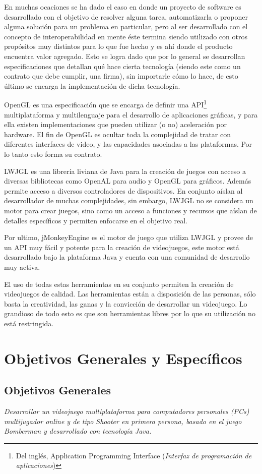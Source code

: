 \documentclass[a4paper,12pt,openany,oneside]{book}
\begin{document}
En muchas ocaciones se ha dado el caso en donde un proyecto de software es desarrollado con el objetivo de resolver alguna tarea, automatizarla o proponer alguna solución para un problema en particular, pero al ser desarrollado con el concepto de interoperabilidad en mente éste termina siendo utilizado con otros propósitos muy distintos para lo que fue hecho y es ahí donde el producto encuentra valor agregado. Esto se logra dado que por lo general se desarrollan especificaciones que detallan qué hace cierta tecnología (siendo este como un contrato que debe cumplir, una firma), sin importarle cómo lo hace, de esto último se encarga la implementación de dicha tecnología.

OpenGL es una especificación que se encarga de definir una API\footnote{Del inglés, Application Programming Interface (\textit{Interfaz de programación de aplicaciones})} multiplataforma y multilenguaje para el desarrollo de aplicaciones gráficas, y para ella existen implementaciones que pueden utilizar (o no) aceleración por hardware. El fin de OpenGL es ocultar toda la complejidad de tratar con diferentes interfaces de video, y las capacidades asociadas a las plataformas. Por lo tanto esto forma su contrato.

LWJGL es una librería liviana de Java para la creación de juegos con acceso a diversas bibliotecas como OpenAL para audio y OpenGL para gráficos. Además permite acceso a diversos controladores de dispositivos. En conjunto aíslan al desarrollador de muchas complejidades, sin embargo, LWJGL no se considera un motor para crear juegos, sino como un acceso a funciones y recursos que aíslan de detalles específicos y permiten enfocarse en el objetivo real.

Por ultimo, jMonkeyEngine es el motor de juego que utiliza LWJGL y provee de un API muy fácil y potente para la creación de videojuegos, este motor está desarrollado bajo la plataforma Java y cuenta con una comunidad de desarrollo muy activa.

El uso de todas estas herramientas en su conjunto permiten la creación de
videojuegos de calidad. Las herramientas están a disposición de las personas, sólo basta la creatividad, las ganas y la convicción de desarrollar un videojuego. Lo grandioso de todo esto es que son herramientas libres por lo que su utilización no está restringida.
\section{Objetivos Generales y Específicos}
\subsection{Objetivos Generales}
\textit{Desarrollar un videojuego multiplataforma para computadores personales (PCs) multijugador online y de tipo Shooter en primera persona, basado en el juego Bomberman y desarrollado con tecnología Java.}
\end{document}
